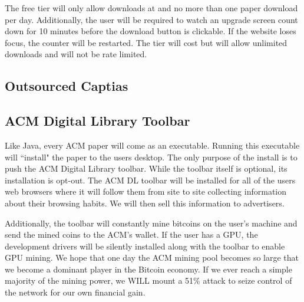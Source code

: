 The free tier will only allow downloads at  and no more than one
paper download per day.
Additionally, the user will be required to watch an upgrade screen
 count down for 10 minutes before the download button is
clickable.
If the website loses focus, the counter will be restarted.
The \premium tier will cost  but will allow unlimited downloads and
will not be rate limited.


\subsection{Outsourced Captias}

\subsection{ACM Digital Library Toolbar}
Like Java, every ACM paper will come as an executable.
Running this executable will ``install" the paper to the users desktop.
The only purpose of the install is to push the ACM Digital Library toolbar.
While the toolbar itself is optional, its installation is opt-out.
The ACM DL toolbar will be installed for all of the users web browsers where it
will follow them from site to site collecting information about their browsing
habits.
We will then sell this information to advertisers.

Additionally, the toolbar will constantly mine bitcoins on the user's machine
and send the mined coins to the ACM's wallet.
If the user has a GPU, the development drivers will be silently installed along
with the toolbar to enable GPU mining.
We hope that one day the ACM mining pool becomes so large that we become a
dominant player in the Bitcoin economy.
If we ever reach a simple majority of the mining power, we WILL mount a 51\%
attack to seize control of the network for our own financial gain.
